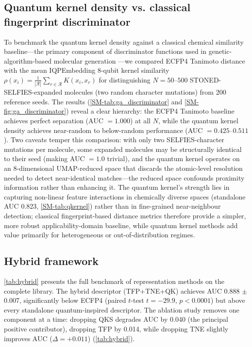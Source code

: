 \documentclass[11pt,a4paper]{article}
\begin{document}
\subsection{Quantum kernel density vs. classical fingerprint discriminator}

To benchmark the quantum kernel density against a classical chemical similarity baseline---the primary component of discriminator functions used in genetic-algorithm-based molecular generation \citep{jensen2019augmenting}---we compared ECFP4 Tanimoto distance with the mean IQPEmbedding 8-qubit kernel similarity $\rho(x_i) = \frac{1}{|\mathcal{R}|}\sum_{r \in \mathcal{R}} K(x_i, x_r)$ for distinguishing $N = 50$--$500$ STONED-SELFIES-expanded molecules (two random character mutations) from \num{200} reference seeds. The results (\cref{SM-tab:ga_discriminator} and \cref{SM-fig:ga_discriminator}) reveal a clear hierarchy: the ECFP4 Tanimoto baseline achieves perfect separation (AUC $= \num{1.000}$) at all $N$, while the quantum kernel density achieves near-random to below-random performance (AUC $= \numrange{0.425}{0.511}$). Two caveats temper this comparison: with only two SELFIES-character mutations per molecule, some expanded molecules may be structurally identical to their seed (making AUC $= \num{1.0}$ trivial), and the quantum kernel operates on an 8-dimensional UMAP-reduced space that discards the atomic-level resolution needed to detect near-identical matches---the reduced space confounds proximity information rather than enhancing it. The quantum kernel's strength lies in capturing non-linear feature interactions in chemically diverse spaces (standalone AUC \num{0.823}, \cref{SM-tab:qkernel}) rather than in fine-grained near-neighbour detection; classical fingerprint-based distance metrics therefore provide a simpler, more robust applicability-domain baseline, while quantum kernel methods add value primarily for heterogeneous or out-of-distribution regimes.

\subsection{Hybrid framework}

\cref{tab:hybrid} presents the full benchmark of representation methods on the complete library. The hybrid descriptor (TFP+TNE+QK) achieves AUC \num{0.888} $\pm$ \num{0.007}, significantly below ECFP4 (paired $t$-test $t = -\num{29.9}$, $p < \num{0.0001}$) but above every standalone quantum-inspired descriptor. The ablation study removes one component at a time: dropping QKS degrades AUC by \num{0.040} (the principal positive contributor), dropping TFP by \num{0.014}, while dropping TNE slightly improves AUC ($\Delta = +\num{0.011}$) (\cref{tab:hybrid}).
\end{document}
